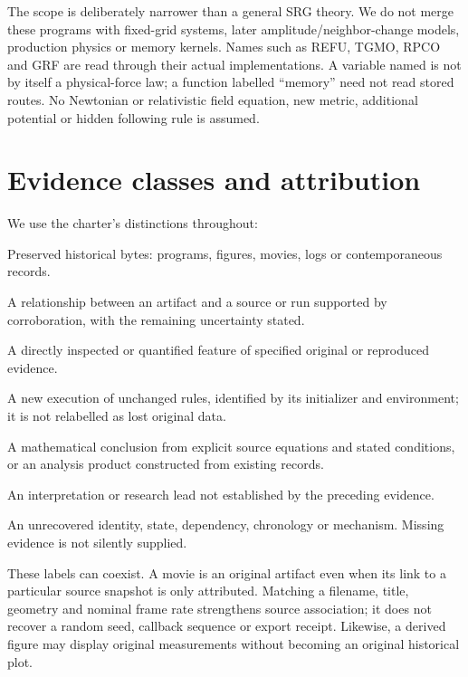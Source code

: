 The scope is deliberately narrower than a general SRG theory. We do not merge
these programs with fixed-grid systems, later amplitude/neighbor-change
models, production physics or memory kernels. Names such as REFU, TGMO, RPCO
and GRF are read through their actual implementations. A variable named
 is not by itself a physical-force law; a function labelled
“memory” need not read stored routes. No Newtonian or relativistic field
equation, new metric, additional potential or hidden following rule is
assumed. 

\section{Evidence classes and attribution}
We use the charter's distinctions throughout:
\begin{description}[style=nextline,leftmargin=0pt]
\item[ORIGINAL] Preserved historical bytes: programs, figures, movies, logs
or contemporaneous records.
\item[ATTRIBUTED] A relationship between an artifact and a source or run
supported by corroboration, with the remaining uncertainty stated.
\item[OBSERVED] A directly inspected or quantified feature of specified
original or reproduced evidence.
\item[REPRODUCED] A new execution of unchanged rules, identified by its
initializer and environment; it is not relabelled as lost original data.
\item[DERIVED] A mathematical conclusion from explicit source equations and
stated conditions, or an analysis product constructed from existing records.
\item[HYPOTHESIS] An interpretation or research lead not established by the
preceding evidence.
\item[MISSING / AMBIGUOUS] An unrecovered identity, state, dependency,
chronology or mechanism. Missing evidence is not silently supplied.
\end{description}

These labels can coexist. A movie is an original artifact even when its link
to a particular source snapshot is only attributed. Matching a filename,
title, geometry and nominal frame rate strengthens source association;
it does not recover a random seed, callback sequence or export receipt.
Likewise, a derived figure may display original measurements without becoming
an original historical plot. 

